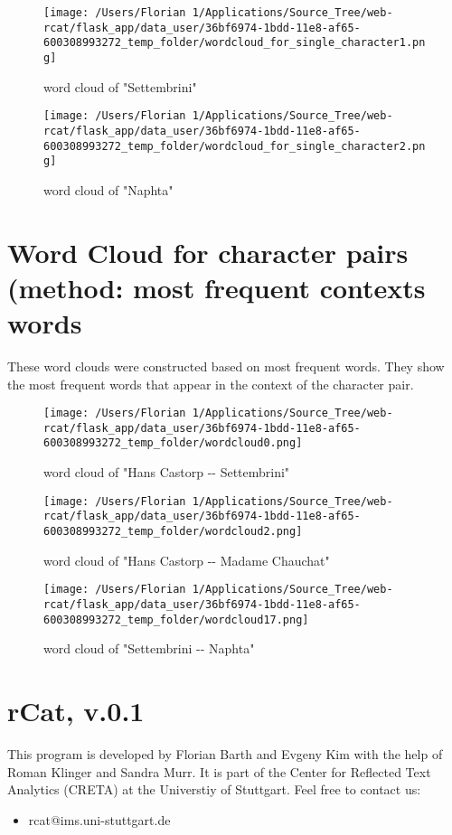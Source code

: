 \documentclass{article}%
\begin{document}
%


\begin{figure}[H]%
\centering%
\texttt{[image: /Users/Florian 1/Applications/Source\_Tree/web-rcat/flask\_app/data\_user/36bf6974-1bdd-11e8-af65-600308993272\_temp\_folder/wordcloud\_for\_single\_character1.png]}%
\caption{word cloud of "Settembrini"}%
\end{figure}

%


\begin{figure}[H]%
\centering%
\texttt{[image: /Users/Florian 1/Applications/Source\_Tree/web-rcat/flask\_app/data\_user/36bf6974-1bdd-11e8-af65-600308993272\_temp\_folder/wordcloud\_for\_single\_character2.png]}%
\caption{word cloud of "Naphta"}%
\end{figure}

%
\section{Word Cloud for character pairs (method: most frequent contexts words}%
These word clouds were constructed based on most frequent words. They show the most frequent words that appear in the context of the character pair. %


\begin{figure}[H]%
\centering%
\texttt{[image: /Users/Florian 1/Applications/Source\_Tree/web-rcat/flask\_app/data\_user/36bf6974-1bdd-11e8-af65-600308993272\_temp\_folder/wordcloud0.png]}%
\caption{word cloud of "Hans Castorp {-}{-} Settembrini"}%
\end{figure}

%


\begin{figure}[H]%
\centering%
\texttt{[image: /Users/Florian 1/Applications/Source\_Tree/web-rcat/flask\_app/data\_user/36bf6974-1bdd-11e8-af65-600308993272\_temp\_folder/wordcloud2.png]}%
\caption{word cloud of "Hans Castorp {-}{-} Madame Chauchat"}%
\end{figure}

%


\begin{figure}[H]%
\centering%
\texttt{[image: /Users/Florian 1/Applications/Source\_Tree/web-rcat/flask\_app/data\_user/36bf6974-1bdd-11e8-af65-600308993272\_temp\_folder/wordcloud17.png]}%
\caption{word cloud of "Settembrini {-}{-} Naphta"}%
\end{figure}

%
\section*{rCat, v.0.1}%
This program is developed by Florian Barth and Evgeny Kim with the help of Roman Klinger and Sandra Murr. It is part of the Center for Reflected Text Analytics (CRETA) at the Universtiy of Stuttgart.\newline%
\newline%
Feel free to contact us:%
\begin{itemize}%
\item%
rcat@ims.uni{-}stuttgart.de%
\end{itemize}

%
\end{document}
